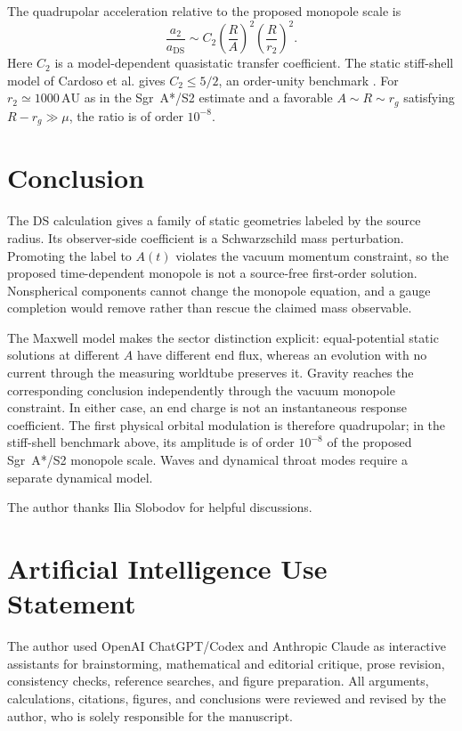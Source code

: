 \documentclass[aps,prd,10pt,onecolumn,nofootinbib,superscriptaddress,floatfix]{revtex4-2}
\begin{document}
The quadrupolar acceleration relative to the proposed monopole scale is
\begin{equation*}
  \frac{a_2}{a_{\mathrm{DS}}}
  \sim C_2\left(\frac{R}{A}\right)^2
  \left(\frac{R}{r_2}\right)^2.
\end{equation*}
Here $C_2$ is a model-dependent quasistatic transfer coefficient.  The static
stiff-shell model of Cardoso et al. gives $C_2\leq5/2$, an order-unity
benchmark \cite{CardosoEtAl2017LoveNumbers}.  For
$r_2\simeq1000\,\mathrm{AU}$ as in the Sgr~A*/S2 estimate and a favorable
$A\sim R\sim r_g$ satisfying $R-r_g\gg\mu$, the ratio is of order $10^{-8}$.

\section{Conclusion}
\label{sec:conclusion}

The DS calculation gives a family of static geometries labeled by the source
radius.  Its observer-side coefficient is a Schwarzschild mass perturbation.
Promoting the label to $A(t)$ violates the vacuum momentum
constraint, so the proposed time-dependent monopole is not a source-free
first-order solution.  Nonspherical components cannot change
the monopole equation, and a gauge completion would remove rather than rescue
the claimed mass observable.

The Maxwell model makes the sector distinction explicit: equal-potential
static solutions at different $A$ have different end flux, whereas an
evolution with no current through the measuring worldtube preserves it.
Gravity reaches the corresponding conclusion independently through the vacuum
monopole constraint.  In either case, an end charge is not an instantaneous
response coefficient.  The first physical orbital modulation is therefore
quadrupolar; in the stiff-shell benchmark above, its amplitude is of order
$10^{-8}$ of the proposed Sgr~A*/S2 monopole scale.  Waves and
dynamical throat modes require a separate dynamical model.

\begin{acknowledgments}
The author thanks Ilia Slobodov for helpful discussions.
\end{acknowledgments}

\section*{Artificial Intelligence Use Statement}

The author used OpenAI ChatGPT/Codex and Anthropic Claude as interactive
assistants for brainstorming, mathematical and editorial critique, prose
revision, consistency checks, reference searches, and figure preparation.  All
arguments, calculations, citations, figures, and conclusions were reviewed and
revised by the author, who is solely responsible for the manuscript.



\end{document}
